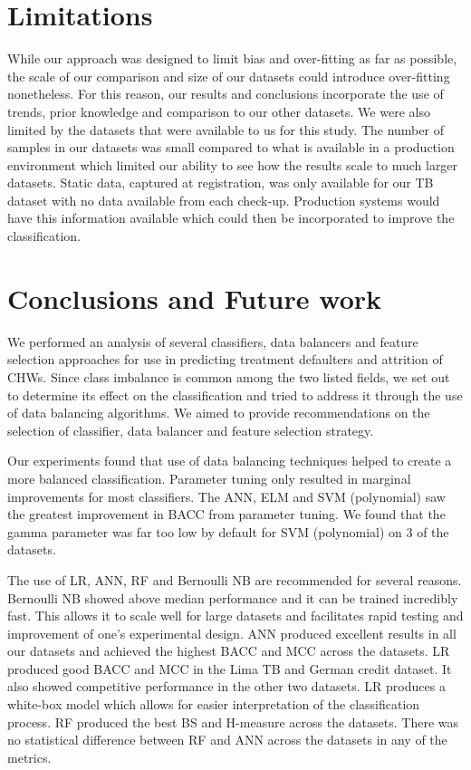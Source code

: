 \documentclass{sig-alternate-05-2015}
\begin{document}
	\section{ Limitations}
	\label{sec:limitations}
	While our approach was designed to limit bias and over-fitting as far as possible, the scale of our comparison and size of our datasets could introduce over-fitting nonetheless. For this reason, our results and conclusions incorporate the use of trends, prior knowledge and comparison to our other datasets. We were also limited by the datasets that were available to us for this study. The number of samples in our datasets was small compared to what is available in a production environment which limited our ability to see how the results scale to much larger datasets. Static data, captured at registration, was only available for our TB dataset with no data available from each check-up. Production systems would have this information available which could then be incorporated to improve the classification.
	
	\section{Conclusions and Future work} 
	We performed an analysis of several classifiers, data balancers and feature selection approaches for use in predicting treatment defaulters and attrition of CHWs. Since class imbalance is common among the two listed fields, we set out to determine its effect on the classification and tried to address it through the use of data balancing algorithms. We aimed to provide recommendations on the selection of classifier, data balancer and feature selection strategy.
	
	Our experiments found that use of data balancing techniques helped to create a more balanced classification. Parameter tuning only resulted in marginal improvements for most classifiers. The ANN, ELM and SVM (polynomial) saw the greatest improvement in BACC from parameter tuning. We found that the gamma parameter was far too low by default for SVM (polynomial) on 3 of the datasets.
	
	The use of LR, ANN, RF and Bernoulli NB are recommended for several reasons. Bernoulli NB showed above median performance and it can be trained incredibly fast. This allows it to scale well for large datasets and facilitates rapid testing and improvement of one's experimental design. ANN produced excellent results in all our datasets and achieved the highest BACC and MCC across the datasets. LR produced good BACC and MCC in the Lima TB and German credit dataset. It also showed competitive performance in the other two datasets. LR produces a white-box model which allows for easier interpretation of the classification process. RF produced the best BS and H-measure across the datasets. There was no statistical difference between RF and ANN across the datasets in any of the metrics.
	
\end{document}
